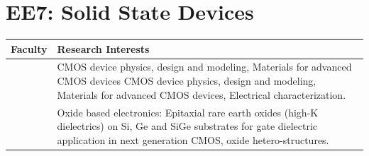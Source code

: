 \documentclass[openany]{book} %
\begin{document}
\section{EE7: Solid State Devices}
\begin{tabular}{p{3.5cm} p{9cm}}

\hline 
\hline
Faculty  & Research Interests \\ 
\hline

\href{https://www.ee.iitb.ac.in/web/people/faculty/home/anilkg}{\color{blue}{Prof. Anil Kottantharayil}} & CMOS device physics, design and modeling, Materials for advanced CMOS devices CMOS device physics, design and modeling, Materials for advanced CMOS devices, Electrical characterization.\\
\hline


\href{https://www.ee.iitb.ac.in/web/people/faculty/home/laha}{\color{blue}{Prof. Apurba Laha}} & Oxide based electronics: Epitaxial rare earth oxides (high-K dielectrics) on Si, Ge and SiGe substrates for gate dielectric application in next generation CMOS, oxide hetero-structures.\\
\hline

\end{tabular}
\end{document}

